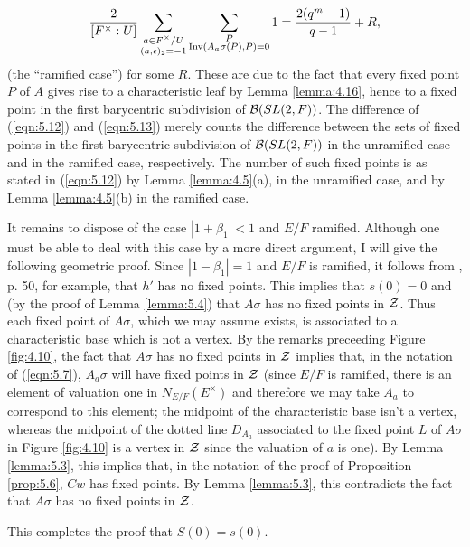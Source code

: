 \documentclass[12pt,letterpaper]{article}
\def\zz{{\cal Z}}
\begin{document}
\begin{equation}
{2\over{[F^{\times}:U]}}
\sum_{\substack{ a\in F^{\times}/U\\ (a,\epsilon)_2 =-1 }}
\sum_{\substack{ P\\ {\rm Inv}(A_a\sigma (P),P) = 0 }} 1
={{2(q^m - 1)}\over{q-1}}+R,
\label{eqn:5.13}
\end{equation}
(the ``ramified case'') for some $R$. 
These are due to the fact that every fixed point $P$ of $A$ gives
rise to a characteristic leaf by Lemma \ref{lemma:4.16}, 
hence to a fixed point in the
first barycentric subdivision of ${\cal B}(SL(2,F))$. The difference
of (\ref{eqn:5.12}) and (\ref{eqn:5.13}) 
merely counts the difference between the
sets of fixed points in the 
first barycentric subdivision of ${\cal B}(SL(2,F))$ in the unramified case
and in the ramified case, respectively. 
The number of such fixed 
points is as stated in (\ref{eqn:5.12}) by 
Lemma \ref{lemma:4.5}(a), in the unramified
case, and by Lemma \ref{lemma:4.5}(b) in the ramified case.
 
It remains to dispose of the case $|1+\beta_1|<1$ and $E/F$ ramified.
Although one must be able to deal with this case by a more direct argument,
I will give the following geometric proof. 
Since $|1-\beta_1|=1$ and $E/F$ is ramified, 
it follows from \cite{La3}, p. 50,
for example, that $h'$ has no fixed points. 
This implies that $s(0)=0$ and
(by the proof of Lemma \ref{lemma:5.4}) that
$A\sigma$ has no fixed points in $\zz$. 
Thus each fixed point of $A\sigma$, which we may 
assume exists, is associated to a
characteristic base which is not a vertex.
By the remarks preceeding Figure \ref{fig:4.10}, the fact that
$A\sigma$ has no fixed points in $\zz$ implies
that, in the notation of (\ref{eqn:5.7}),
$A_a\sigma$ will have fixed points in $\zz$ (since $E/F$ is ramified,
there is an element of valuation one in $N_{E/F}(E^\times )$
and therefore we may take $A_a$ to correspond to this element; the midpoint
of the characteristic base isn't a vertex,
whereas the midpoint of the dotted line $D_{A_a}$ associated to the fixed
point $L$ of $A\sigma$ in Figure \ref{fig:4.10} is a vertex in $\zz$
since the valuation of $a$ is one). By Lemma \ref{lemma:5.3}, 
this implies that,
in the notation of the proof of Proposition \ref{prop:5.6},
$Cw$ has fixed points. By Lemma \ref{lemma:5.3},
this contradicts the fact that $A\sigma$ has no fixed points in $\zz$.
 
This completes the proof that $S(0)=s(0)$.

 
\end{document}
